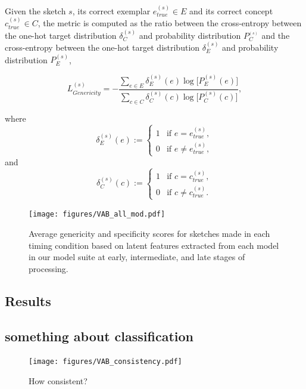 \documentclass[10pt,letterpaper]{article}
\begin{document}
Given the sketch $s$, its correct exemplar $e_{true}^{(s)}\in E$ and its correct concept $c_{true}^{(s)} \in C$, the metric is computed as the ratio between the cross-entropy between the one-hot target distribution $\delta_{C}^{(s)}$ and probability distribution $P_{C}^_{(s)}$ and the cross-entropy between the one-hot target distribution $\delta_{E}^{(s)}$ and probability distribution $P_{E}^{(s)}$,

\begin{equation}\label{eq:genericity}
    L_{Genericity}^{(s)} =-\frac{\sum_{e\in E}{\delta_{E}^{(s)}(e) \log{[P_{E}^{(s)}(e)}]}}{\sum_{c\in C}{\delta_{C}^{(s)}(c)  \log{[P_{C}^{(s)}(c)}]}},
\end{equation}

where 
\begin{equation}\label{eq:one hot}
    \delta_{E}^{(s)}(e) :=
    \begin{cases}
1 &\text{if } e = e_{true}^{(s)}, \\
0 &\text{if } e \neq e_{true}^{(s)},
\end{cases}
\end{equation}
and
\begin{equation}\label{eq:one hot}
    \delta_{C}^{(s)}(c) :=
    \begin{cases}
1 &\text{if } c = c_{true}^{(s)}, \\
0 &\text{if } c \neq c_{true}^{(s)}.
\end{cases}
\end{equation}



\begin{figure}[ht!!]
    \centering
    \texttt{[image: figures/VAB\_all\_mod.pdf]}
    \caption{Average genericity and specificity scores for sketches made in each timing condition based on latent features extracted from each model in our model suite at early, intermediate, and late stages of processing. }
    \label{fig:all_models}
\end{figure}


\subsection{Results}

\subsection{something about classification}

\begin{figure}
    \centering
    \texttt{[image: figures/VAB\_consistency.pdf]}
    \caption{How consistent?}
    \label{fig:consistency}
\end{figure}
\end{document}
